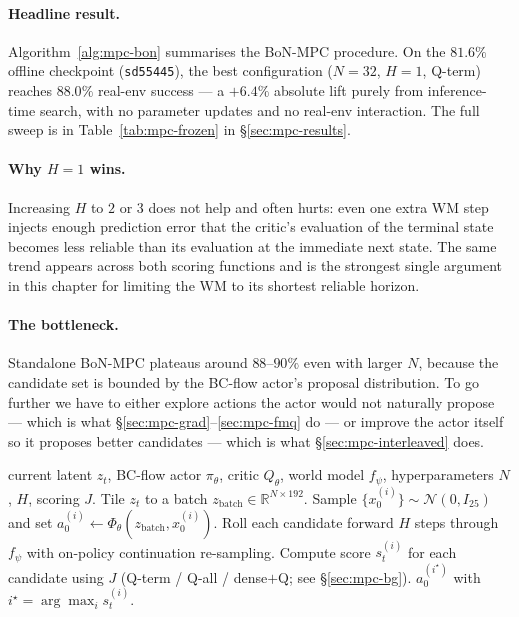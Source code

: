 \paragraph{Headline result.} Algorithm~\ref{alg:mpc-bon} summarises the BoN-MPC procedure. On the $81.6\%$ offline checkpoint (\texttt{sd55445}), the best configuration ($N = 32$, $H = 1$, Q-term) reaches $88.0\%$ real-env success --- a $+6.4\%$ absolute lift purely from inference-time search, with no parameter updates and no real-env interaction. The full sweep is in Table~\ref{tab:mpc-frozen} in \S\ref{sec:mpc-results}.

\paragraph{Why $H = 1$ wins.} Increasing $H$ to $2$ or $3$ does not help and often hurts: even one extra WM step injects enough prediction error that the critic's evaluation of the terminal state becomes less reliable than its evaluation at the immediate next state. The same trend appears across both scoring functions and is the strongest single argument in this chapter for limiting the WM to its shortest reliable horizon.

\paragraph{The bottleneck.} Standalone BoN-MPC plateaus around $88$--$90\%$ even with larger $N$, because the candidate set is bounded by the BC-flow actor's proposal distribution. To go further we have to either explore actions the actor would not naturally propose --- which is what \S\ref{sec:mpc-grad}--\ref{sec:mpc-fmq} do --- or improve the actor itself so it proposes better candidates --- which is what \S\ref{sec:mpc-interleaved} does.

\begin{algorithm}[t]
\caption{Best-of-$N$ MPC inference}
\label{alg:mpc-bon}
\begin{algorithmic}[1]
\Require current latent $z_t$, BC-flow actor $\pi_\theta$, critic $Q_\theta$, world model $f_\psi$, hyperparameters $N$, $H$, scoring $J$.
\State Tile $z_t$ to a batch $z_{\text{batch}} \in \mathbb{R}^{N \times 192}$.
\State Sample $\{x_0^{(i)}\} \sim \mathcal{N}(0, I_{25})$ and set $a_0^{(i)} \leftarrow \Phi_\theta(z_{\text{batch}}, x_0^{(i)})$.
\State Roll each candidate forward $H$ steps through $f_\psi$ with on-policy continuation re-sampling.
\State Compute score $s_t^{(i)}$ for each candidate using $J$ (Q-term / Q-all / dense$+$Q; see \S\ref{sec:mpc-bg}).
\State \Return $a_0^{(i^\star)}$ with $i^\star = \arg\max_i s_t^{(i)}$.
\end{algorithmic}
\end{algorithm}

